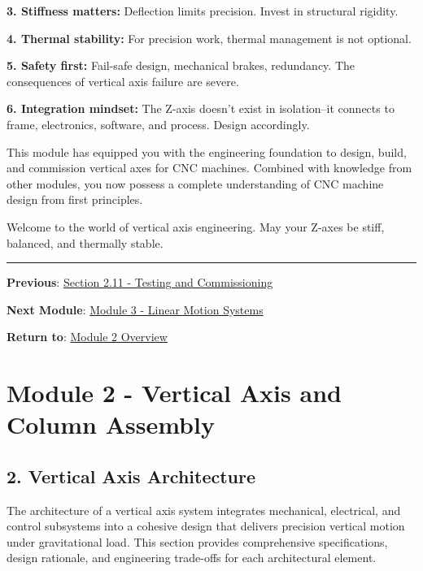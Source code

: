 \documentclass[
]{article}
\begin{document}
\textbf{3. Stiffness matters:} Deflection limits precision. Invest in
structural rigidity.

\textbf{4. Thermal stability:} For precision work, thermal management is
not optional.

\textbf{5. Safety first:} Fail-safe design, mechanical brakes,
redundancy. The consequences of vertical axis failure are severe.

\textbf{6. Integration mindset:} The Z-axis doesn't exist in
isolation--it connects to frame, electronics, software, and process.
Design accordingly.

This module has equipped you with the engineering foundation to design,
build, and commission vertical axes for CNC machines. Combined with
knowledge from other modules, you now possess a complete understanding
of CNC machine design from first principles.

Welcome to the world of vertical axis engineering. May your Z-axes be
stiff, balanced, and thermally stable.

\begin{center}\rule{0.5\linewidth}{0.5pt}\end{center}

\textbf{Previous}: \href{section-2.11-testing-commissioning.md}{Section
2.11 - Testing and Commissioning}

\textbf{Next Module}:
\href{../Module-03/module-03-linear-motion.md}{Module 3 - Linear Motion
Systems}

\textbf{Return to}: \href{module-2-vertical-axis.md}{Module 2 Overview}

\newpage

\section{Module 2 - Vertical Axis and Column
Assembly}\label{module-2---vertical-axis-and-column-assembly-1}

\subsection{2. Vertical Axis
Architecture}\label{vertical-axis-architecture}

The architecture of a vertical axis system integrates mechanical,
electrical, and control subsystems into a cohesive design that delivers
precision vertical motion under gravitational load. This section
provides comprehensive specifications, design rationale, and engineering
trade-offs for each architectural element.
\end{document}
